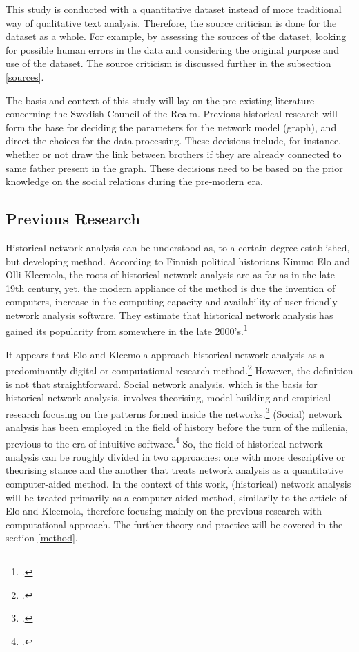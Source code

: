This study is conducted with a quantitative dataset instead of more traditional way of qualitative text analysis. Therefore, the source criticism is done for the dataset as a whole. For example, by assessing the sources of the dataset, looking for possible human errors in the data and considering the original purpose and use of the dataset. The source criticism is discussed further in the subsection \ref{sources}.

The basis and context of this study will lay on the pre-existing literature concerning the Swedish Council of the Realm. Previous historical research will form the base for deciding the parameters for the network model (graph), and direct the choices for the data processing. These decisions include, for instance, whether or not draw the link between brothers if they are already connected to same father present in the graph. These decisions need to be based on the prior knowledge on the social relations during the pre-modern era. 

\subsection{Previous Research}
Historical network analysis can be understood as, to a certain degree established, but developing method. According to Finnish political historians Kimmo Elo and Olli Kleemola, the roots of historical network analysis are as far as in the late 19th century, yet, the modern appliance of the method is due the invention of computers, increase in the computing capacity and availability of user friendly network analysis software. They estimate that historical network analysis has gained its popularity from somewhere in the late 2000's.\footcite[pp. 415-417.]{eloAklee15} 

It appears that Elo and Kleemola approach historical network analysis as a predominantly digital or computational research method.\footcite[pp. 415-417.]{eloAklee15} However, the definition is not that straightforward. Social network analysis, which is the basis for historical network analysis, involves theorising, model building and empirical research focusing on the patterns formed inside the networks.\footcite[pp. 22-24.]{Keats-R2007} (Social) network analysis has been employed in the field of history before the turn of the millenia, previous to the era of intuitive software.\footcite[TODO check!]{AronssonEtA1999} So, the field of historical network analysis can be roughly divided in two approaches: one with more descriptive or theorising stance and the another that treats network analysis as a quantitative computer-aided method. In the context of this work, (historical) network analysis will be treated primarily as a computer-aided method, similarily to the article of Elo and Kleemola, therefore focusing mainly on the previous research with computational approach. The further theory and practice will be covered in the section \ref{method}.


